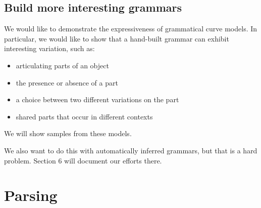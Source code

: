 \documentclass{book}
\begin{document}
\subsection{Build more interesting grammars}
\label{sec-2_2_3}

We would like to demonstrate the expressiveness of grammatical curve
models. In particular, we would like to show that a hand-built grammar
can exhibit interesting variation, such as:
\begin{itemize}
\item articulating parts of an object
\item the presence or absence of a part
\item a choice between two different variations on the part
\item shared parts that occur in different contexts
\end{itemize}

We will show samples from these models.

We also want to do this with automatically inferred grammars, but that
is a hard problem. Section 6 will document our efforts there.
\section{Parsing}
\label{sec-2_3}
\end{document}
